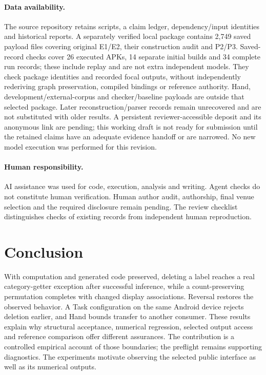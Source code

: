 \documentclass[10pt,conference]{IEEEtran}
\begin{document}
\paragraph{Data availability.}
The source repository retains scripts, a claim ledger, dependency/input identities and historical reports. A separately verified local package contains 2,749 saved payload files covering original E1/E2, their construction audit and P2/P3. Saved-record checks cover 26 executed APKs, 14 separate initial builds and 34 complete run records; these include replay and are not extra independent models. They check package identities and recorded focal outputs, without independently rederiving graph preservation, compiled bindings or reference authority. Hand, development/external-corpus and checker/baseline payloads are outside that selected package. Later reconstruction/parser records remain unrecovered and are not substituted with older results. A persistent reviewer-accessible deposit and its anonymous link are pending; this working draft is not ready for submission until the retained claims have an adequate evidence handoff or are narrowed. No new model execution was performed for this revision.

\paragraph{Human responsibility.}
AI assistance was used for code, execution, analysis and writing. Agent checks do not constitute human verification. Human author audit, authorship, final venue selection and the required disclosure remain pending. The review checklist distinguishes checks of existing records from independent human reproduction.

\section{Conclusion}
With computation and generated code preserved, deleting a label reaches a real category-getter exception after successful inference, while a count-preserving permutation completes with changed display associations. Reversal restores the observed behavior. A Task configuration on the same Android device rejects deletion earlier, and Hand bounds transfer to another consumer. These results explain why structural acceptance, numerical regression, selected output access and reference comparison offer different assurances. The contribution is a controlled empirical account of those boundaries; the preflight remains supporting diagnostics. The experiments motivate observing the selected public interface as well as its numerical outputs.
\end{document}
